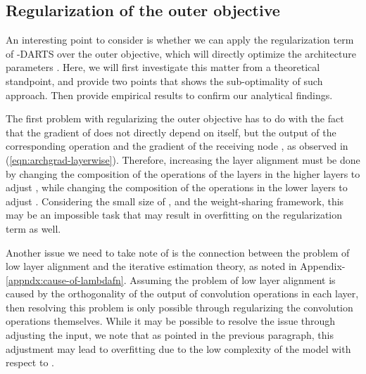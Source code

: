 \documentclass{article} \usepackage{fancyhdr, iclr2023_conference, times}
\newcommand{\mydarts}{-DARTS\xspace}
\newcommand{\lambdafn}{layer alignment\xspace}
\begin{document}
\subsection{Regularization of the outer objective}
\label{appndx:outer-obj}
\par An interesting point to consider is whether we can apply the regularization term of \mydarts over the outer objective, which will directly optimize the architecture parameters . Here, we will first investigate this matter from a theoretical standpoint, and provide two points that shows the sub-optimality of such approach. Then provide empirical results to confirm our analytical findings.
\par The first problem with regularizing the outer objective has to do with the fact that the gradient of  does not directly depend on  itself, but the output of the corresponding operation  and the gradient of the receiving node , as observed in (\ref{eqn:archgrad-layerwise}). Therefore, increasing the \lambdafn must be done by changing the composition of the operations of the layers in the higher layers to adjust , while changing the composition of the operations in the lower layers to adjust . Considering the small size of , and the weight-sharing framework, this may be an impossible task that may result in overfitting on the regularization term as well.
\par Another issue we need to take note of is the connection between the problem of low \lambdafn and the iterative estimation theory, as noted in Appendix-\ref{appndx:cause-of-lambdafn}. Assuming the problem of low \lambdafn is caused by the orthogonality of the output of convolution operations in each layer, then resolving this problem is only possible through regularizing the convolution operations themselves. While it may be possible to resolve the issue through adjusting the input, we note that as pointed in the previous paragraph, this adjustment may lead to overfitting due to the low complexity of the model with respect to .
\end{document}
